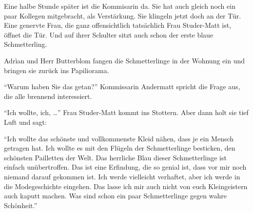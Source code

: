 Eine halbe Stunde später ist die Kommisarin da. Sie hat auch gleich noch ein paar Kollegen mitgebracht, als Verstärkung. Sie klingeln jetzt doch an der Tür. Eine genervte Frau, die ganz offensichtlich tatsächlich Frau Studer-Matt ist, öffnet die Tür. Und auf ihrer Schulter sitzt auch schon der erste blaue Schmetterling.
\begin{center}
\end{center}
Adrìan und Herr Butterblom fangen die Schmetterlinge in der Wohnung ein und bringen sie zurück ins Papiliorama. 

\enquote{Warum haben Sie das getan?} Kommissarin Andermatt spricht die Frage aus, die alle brennend interessiert.

\enquote{Ich wollte, ich, \dots} Frau Studer-Matt kommt ins Stottern. Aber dann holt sie tief Luft und sagt: 

\enquote{Ich wollte das schönste und vollkommenste Kleid nähen, dass je ein Mensch getragen hat. Ich wollte es mit den Flügeln der Schmetterlinge besticken, den schönsten Pailletten der Welt. Das herrliche Blau dieser Schmetterlinge ist einfach unübertroffen. Das ist eine Erfindung, die so genial ist, dass vor mir noch niemand darauf gekommen ist. Ich werde vielleicht verhaftet, aber ich werde in die Modegeschichte eingehen. Das lasse ich mir auch nicht von euch Kleingeistern auch kaputt machen. Was sind schon ein paar Schmetterlinge gegen wahre Schönheit.}

